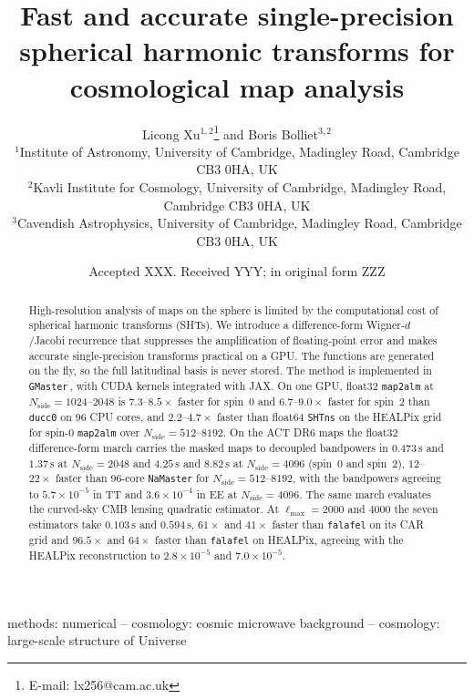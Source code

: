 \documentclass[letters,usenatbib,useAMS]{mnras}
\title[GMaster: fast single-precision spherical harmonic transforms]
{Fast and accurate single-precision spherical harmonic transforms for cosmological map analysis}
\author[L. Xu \& B. Bolliet]{
Licong Xu$^{1,2}$\thanks{E-mail: lx256@cam.ac.uk}
and Boris Bolliet$^{3,2}$
\\
$^{1}$Institute of Astronomy, University of Cambridge, Madingley Road, Cambridge CB3 0HA, UK\\
$^{2}$Kavli Institute for Cosmology, University of Cambridge, Madingley Road, Cambridge CB3 0HA, UK\\
$^{3}$Cavendish Astrophysics, University of Cambridge, Madingley Road, Cambridge CB3 0HA, UK
}
\date{Accepted XXX. Received YYY; in original form ZZZ}
\begin{document}
\label{firstpage}
\pagerange{\pageref{firstpage}--\pageref{lastpage}}
\maketitle

\begin{abstract}
High-resolution analysis of maps on the sphere is limited by the computational cost of spherical harmonic transforms (SHTs). We introduce a difference-form Wigner-$d$/Jacobi recurrence that suppresses the amplification of floating-point error and makes accurate single-precision transforms practical on a GPU. The functions are generated on the fly, so the full latitudinal basis is never stored. The method is implemented in \texttt{GMaster}\,\href{https://github.com/licongxu/GMaster}{\faGithub}, with CUDA kernels integrated with JAX. On one GPU, float32 \texttt{map2alm} at $N_{\mathrm{side}}=1024$--$2048$ is $7.3$--$8.5\times$ faster for spin~0 and $6.7$--$9.0\times$ faster for spin~2 than \texttt{ducc0} on 96 CPU cores, and $2.2$--$4.7\times$ faster than float64 \texttt{SHTns} on the HEALPix grid for spin-0 \texttt{map2alm} over $N_{\mathrm{side}}=512$--$8192$. On the ACT DR6 maps the float32 difference-form march carries the masked maps to decoupled bandpowers in $0.473\,\mathrm{s}$ and $1.37\,\mathrm{s}$ at $N_{\mathrm{side}}=2048$ and $4.25\,\mathrm{s}$ and $8.82\,\mathrm{s}$ at $N_{\mathrm{side}}=4096$ (spin~0 and spin~2), $12$--$22\times$ faster than 96-core \texttt{NaMaster} for $N_{\mathrm{side}}=512$--$8192$, with the bandpowers agreeing to $5.7\times10^{-5}$ in TT and $3.6\times10^{-4}$ in EE at $N_{\mathrm{side}}=4096$. The same march evaluates the curved-sky CMB lensing quadratic estimator. At $\ell_{\max}=2000$ and $4000$ the seven estimators take $0.103\,\mathrm{s}$ and $0.594\,\mathrm{s}$, $61\times$ and $41\times$ faster than \texttt{falafel} on its CAR grid and $96.5\times$ and $64\times$ faster than \texttt{falafel} on HEALPix, agreeing with the HEALPix reconstruction to $2.8\times10^{-5}$ and $7.0\times10^{-5}$.
\end{abstract}

\begin{keywords}
methods: numerical -- cosmology: cosmic microwave background -- cosmology: large-scale structure of Universe
\end{keywords}
\end{document}
